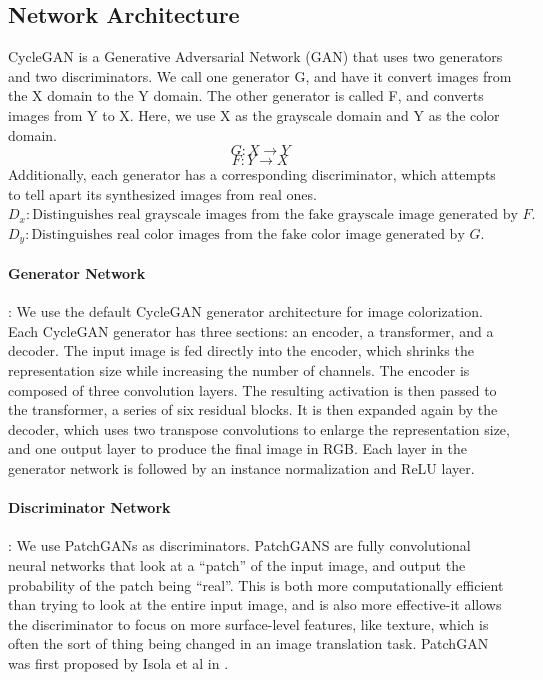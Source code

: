 \documentclass{article} %
\begin{document}
\subsection{Network Architecture}
CycleGAN is a Generative Adversarial Network (GAN) that uses two generators and two discriminators. We call one generator G, and have it convert images from the X domain to the Y domain. The other generator is called F, and converts images from Y to X. Here, we use X as the grayscale domain and Y as the color domain.
    $$G : X \rightarrow Y$$
    $$F : Y \rightarrow X$$
Additionally, each generator has a corresponding discriminator, which attempts to tell apart its synthesized images from real ones.\newline \newline
$D_x : \text{Distinguishes real grayscale images from the fake grayscale image generated by } F.$ \newline
$D_y : \text{Distinguishes real color images from the fake color image generated by } G.$ 
\newline
\paragraph{Generator Network}: We use the default CycleGAN generator architecture for image colorization. Each CycleGAN generator has three sections: an encoder, a transformer, and a decoder. The input image is fed directly into the encoder, which shrinks the representation size while increasing the number of channels. The encoder is composed of three convolution layers. The resulting activation is then passed to the transformer, a series of six residual blocks. It is then expanded again by the decoder, which uses two transpose convolutions to enlarge the representation size, and one output layer to produce the final image in RGB. Each layer in the generator network is followed by an instance normalization and ReLU layer. 
\paragraph{Discriminator Network}: We use PatchGANs as discriminators. PatchGANS are fully convolutional neural networks that look at a “patch” of the input image, and output the probability of the patch being “real”. This is both more computationally efficient than trying to look at the entire input image, and is also more effective-it allows the discriminator to focus on more surface-level features, like texture, which is often the sort of thing being changed in an image translation task. PatchGAN was first proposed by Isola et al in \cite{pix2pix}.
\end{document}
